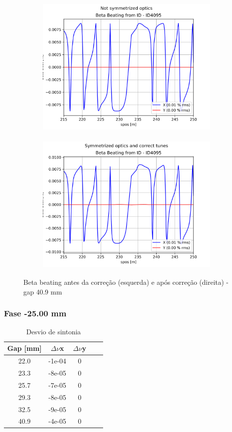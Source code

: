 \documentclass[a4paper,12pt]{article}
\begin{document}
\begin{figure}[H]
\begin{subfigure}{0.5\textwidth}
\includegraphics[width=0.9\linewidth, height=7cm]{figs/phase16 gap40 uncorrected-optics.png} 
\label{fig:subim11640}
\end{subfigure}
\begin{subfigure}{0.5\textwidth}
\includegraphics[width=0.9\linewidth, height=7cm]{figs/phase16 gap40 corrected-optics-tunes.png}
\label{fig:subim21640}
\end{subfigure}
\caption{Beta beating antes da correção (esquerda) e após correção (direita) - gap 40.9 mm}
\label{fig:bb16_40}
\end{figure}

\subsubsection{Fase -25.00 mm}

\begin{table}[H]
\centering
\caption{Desvio de sintonia}
\begin{tabular}{|c|c|c|c|c|}
\hline
Gap {[}mm{]} & $\Delta \nu$x & $\Delta \nu$y\\ \hline
22.0 & -1e-04 & 0\\ \hline
23.3 & -8e-05 & 0\\ \hline
25.7 & -7e-05 & 0\\ \hline
29.3 & -8e-05 & 0\\ \hline
32.5 & -9e-05 & 0\\ \hline
40.9 & -4e-05 & 0\\ \hline
\end{tabular}
\label{tab:coropt-25}
\end{table}
\end{document}
